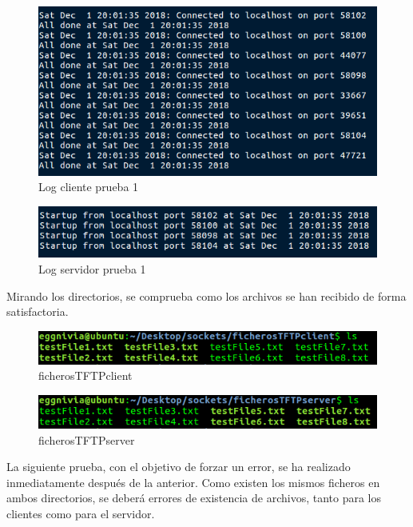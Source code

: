 \documentclass[journal, a4paper]{IEEEtran}
\begin{document}
\begin{figure}[H]
\centering
\includegraphics[scale=0.55]{images/log_cliente_prueba_1}
\caption{Log cliente prueba 1}
\end{figure}

\begin{figure}[H]
\centering
\includegraphics[scale=0.6]{images/log_server_prueba_1}
\caption{Log servidor prueba 1}
\end{figure}

Mirando los directorios, se comprueba como los archivos se han recibido de forma satisfactoria.

\begin{figure}[H]
\centering
\includegraphics[scale=0.6]{images/client_after_1}
\caption{ficherosTFTPclient}
\end{figure}

\begin{figure}[H]
\centering
\includegraphics[scale=0.6]{images/server_after_1}
\caption{ficherosTFTPserver}
\end{figure}

La siguiente prueba, con el objetivo de forzar un error, se ha realizado inmediatamente después de la anterior. Como existen los mismos ficheros en ambos directorios, se deberá errores de existencia de archivos, tanto para los clientes como para el servidor.
\end{document}
